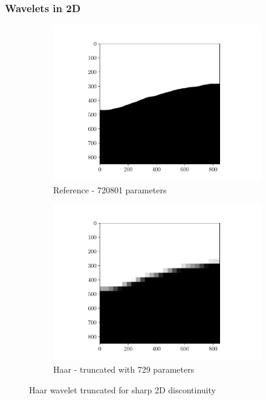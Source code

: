 \subsubsection{Wavelets in 2D}

\begin{figure}
\begin{subfigure}[t]{0.5\linewidth}
    \centering
    \includegraphics[width=\linewidth]{Figures/2D_ref.pdf}
    \caption{Reference - 720801 parameters}
\end{subfigure}
  \begin{subfigure}[t]{0.5\linewidth}
    \centering
    \includegraphics[width=\linewidth]{Figures/2D_comp_haar.pdf}
    \caption{Haar - truncated with 729 parameters}
\end{subfigure}  
\caption{Haar wavelet truncated for sharp 2D discontinuity}
    \label{Wavelet_2D}
\end{figure}

